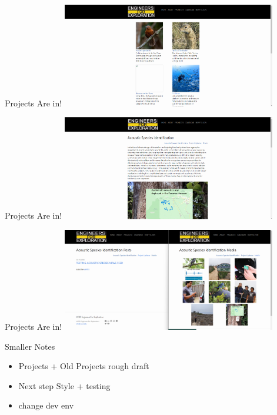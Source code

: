 \begin{frame}{Projects Are in!}
    \centering
    \includegraphics[height=0.7\textheight,width=0.7\textwidth,keepaspectratio]{images/web_image.png}
\end{frame}

\begin{frame}{Projects Are in!}
    \centering
    \includegraphics[height=0.7\textheight,width=0.7\textwidth,keepaspectratio]{images/web_image2.png}
\end{frame}

\begin{frame}{Projects Are in!}
    \centering
    \includegraphics[height=0.7\textheight,width=0.7\textwidth,keepaspectratio]{images/web_image3.png}
\end{frame}

\begin{frame}{Smaller Notes}
    \begin{itemize}
        \item Projects + Old Projects rough draft
        \item Next step Style + testing
        \item change dev env
    \end{itemize}
\end{frame}

